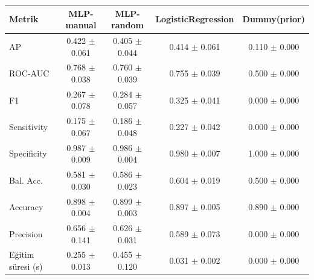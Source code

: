 \begin{tabular}{lcccc}\toprule
Metrik & MLP-manual & MLP-random & LogisticRegression & Dummy(prior) \\\midrule
AP & 0.422 $\pm$ 0.061 & 0.405 $\pm$ 0.044 & 0.414 $\pm$ 0.061 & 0.110 $\pm$ 0.000 \\
ROC-AUC & 0.768 $\pm$ 0.038 & 0.760 $\pm$ 0.039 & 0.755 $\pm$ 0.039 & 0.500 $\pm$ 0.000 \\
F1 & 0.267 $\pm$ 0.078 & 0.284 $\pm$ 0.057 & 0.325 $\pm$ 0.041 & 0.000 $\pm$ 0.000 \\
Sensitivity & 0.175 $\pm$ 0.067 & 0.186 $\pm$ 0.048 & 0.227 $\pm$ 0.042 & 0.000 $\pm$ 0.000 \\
Specificity & 0.987 $\pm$ 0.009 & 0.986 $\pm$ 0.004 & 0.980 $\pm$ 0.007 & 1.000 $\pm$ 0.000 \\
Bal. Acc. & 0.581 $\pm$ 0.030 & 0.586 $\pm$ 0.023 & 0.604 $\pm$ 0.019 & 0.500 $\pm$ 0.000 \\
Accuracy & 0.898 $\pm$ 0.004 & 0.899 $\pm$ 0.003 & 0.897 $\pm$ 0.005 & 0.890 $\pm$ 0.000 \\
Precision & 0.656 $\pm$ 0.141 & 0.626 $\pm$ 0.031 & 0.589 $\pm$ 0.073 & 0.000 $\pm$ 0.000 \\
Eğitim süresi (s) & 0.255 $\pm$ 0.013 & 0.455 $\pm$ 0.120 & 0.031 $\pm$ 0.002 & 0.000 $\pm$ 0.000 \\
\bottomrule\end{tabular}